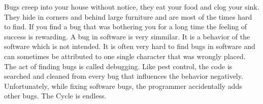
Bugs creep into your house without notice, they eat your food and clog your sink.
They hide in corners and behind large furniture and are most of the times hard to find. If you find a bug that was bothering you for a long time the feeling of success is rewarding.
A bug in software is very simmilar. It is a behavior of the software which is not intended. It is often very hard to find bugs in software and can sometimes be attributed to one single character that was wrongly placed. The act of finding bugs is called debugging. Like pest control, the code is searched and cleaned from every bug that influences the behavior negatively.
Unfortunately, while fixing software bugs, the programmer accidentally adds other bugs. The Cycle is endless.

